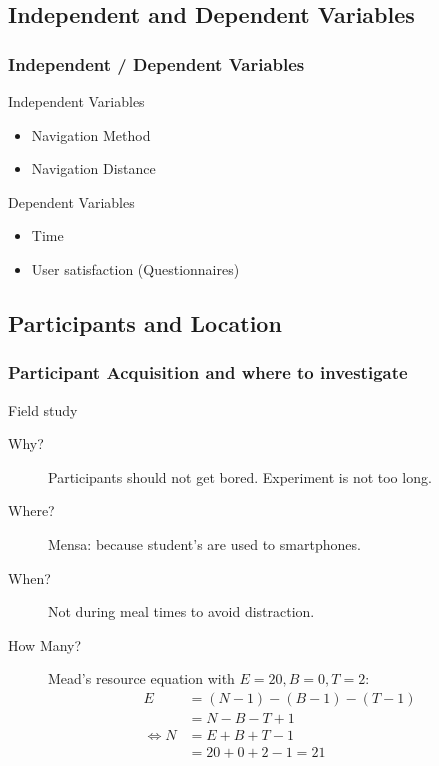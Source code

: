 \documentclass{beamer}
\begin{document}
\subsection{Independent and Dependent Variables}
\begin{frame}
        \frametitle{Independent / Dependent Variables}
        \begin{block}{Independent Variables}
                \begin{itemize}
                        \item Navigation Method
                        \item Navigation Distance
                \end{itemize}
        \end{block}
        \begin{block}{Dependent Variables}
                \begin{itemize}
                        \item Time
                        \item User satisfaction (Questionnaires)
                \end{itemize}
        \end{block}
\end{frame}

\subsection{Participants and Location}
\begin{frame}
        \frametitle{Participant Acquisition and where to investigate}
        \begin{block}{Field study}
                \begin{description}
                        \item[Why?] Participants should not get bored.
                                Experiment is not too long.
                        \item[Where?] Mensa: because student's are used to smartphones.
                        \item[When?] Not during meal times to avoid distraction.
                        \item[How Many?] Mead's resource equation with $E=20, B=0, T=2$:
                          \begin{align*}
                            E &= (N - 1) - (B - 1) - (T - 1)\\
                            & = N - B - T + 1 \\
                            \Leftrightarrow  N &= E + B + T - 1\\
                            &= 20 + 0 + 2 - 1 = 21
                          \end{align*}
                \end{description}

        \end{block}
\end{frame}
\end{document}
